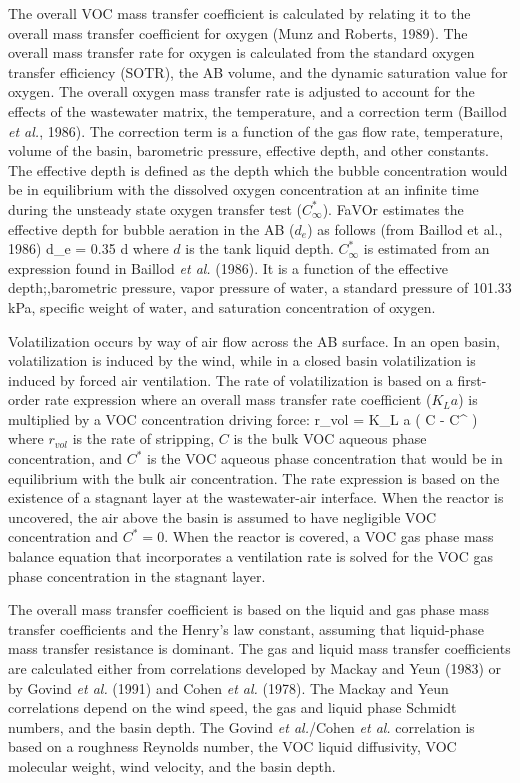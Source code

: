 The overall VOC mass transfer coefficient is calculated by relating it to the
overall mass transfer coefficient for oxygen (Munz and Roberts, 1989).  The
overall mass transfer rate for oxygen is calculated from the standard oxygen
transfer efficiency (SOTR), the AB volume, and the dynamic saturation value for
oxygen.  The overall oxygen mass transfer rate is adjusted to account for the
effects of the wastewater matrix, the temperature, and a correction term
(Baillod  {\it et al.}, 1986). The correction term is a function of the gas
flow rate, temperature, volume of the basin, barometric pressure, effective
depth, and other constants.  The effective depth is defined as the depth which
the bubble concentration would be in equilibrium with the dissolved oxygen
concentration at an infinite time during the unsteady state oxygen transfer
test ($C_{\infty}^{\ast}$).  FaVOr estimates the effective depth for bubble
aeration in the AB ($d_e$) as follows (from Baillod et al., 1986)
\mb
d_e = 0.35 d
\mef
where $d$ is the tank liquid depth.  $C_{\infty}^{\ast}$ is estimated from an
expression found in Baillod {\it et al.} (1986).  It is a function of the
effective depth;,barometric pressure, vapor pressure of water, a standard
pressure of 101.33 kPa, specific weight of water, and saturation concentration
of oxygen.


Volatilization occurs by way of air flow across the AB surface. In an open
basin, volatilization is induced by the wind, while in a closed basin
volatilization is induced by forced air ventilation.  The rate of
volatilization is based on a first-order rate expression where an overall mass
transfer rate coefficient ($K_L a$) is multiplied by a VOC concentration
driving force:
\mb
r_{vol} = K_L a ( C - C^{\ast} )
\mef
where $r_{vol}$ is the rate of stripping, $C$ is the bulk VOC aqueous phase
concentration, and $C^{\ast}$ is the VOC aqueous phase concentration that would
be in equilibrium with the bulk air concentration.  The rate expression is
based on the existence of a stagnant layer at the wastewater-air interface.
When the reactor is uncovered, the air above the basin is assumed to have
negligible VOC concentration and $C^{\ast} = 0$.  When the reactor is covered,
a VOC gas phase mass balance equation that incorporates a ventilation rate is
solved for the VOC gas phase concentration in the stagnant layer.  

The overall mass transfer coefficient is based on the liquid and gas phase mass
transfer coefficients and the Henry's law constant, assuming that liquid-phase
mass transfer resistance is dominant.  The gas and liquid mass transfer
coefficients are calculated either from correlations developed by Mackay and
Yeun (1983) or by Govind {\it et al.} (1991) and Cohen {\it et al.} (1978).
The Mackay and Yeun correlations depend on the wind speed, the gas and liquid
phase Schmidt numbers, and the basin depth.  The Govind {\it et al.}/Cohen {\it
et al.} correlation is based on a roughness Reynolds number, the VOC liquid
diffusivity, VOC molecular weight, wind velocity, and the basin depth.

